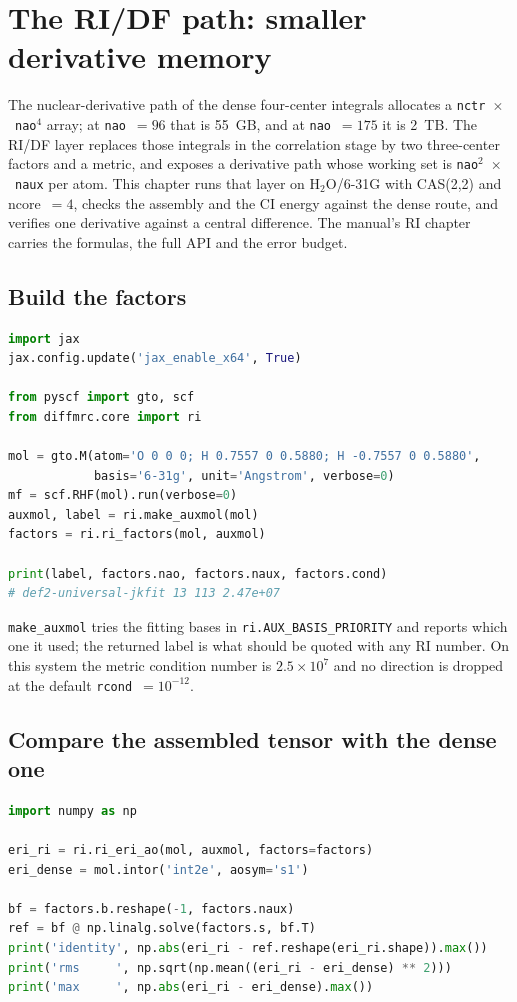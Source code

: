 \section{The RI/DF path: smaller derivative memory}
\label{sec:ri-df}

The nuclear-derivative path of the dense four-center integrals allocates
a \texttt{nctr}~$\times$~\texttt{nao}$^4$ array; at \texttt{nao}~$=96$
that is 55~GB, and at \texttt{nao}~$=175$ it is 2~TB.  The RI/DF layer
replaces those integrals in the correlation stage by two three-center
factors and a metric, and exposes a derivative path whose working set is
\texttt{nao}$^2$~$\times$~\texttt{naux} per atom.  This chapter runs
that layer on H$_2$O/6-31G with CAS(2,2) and ncore~$=4$, checks the
assembly and the CI energy against the dense route, and verifies one
derivative against a central difference.  The manual's RI chapter
carries the formulas, the full API and the error budget.

\subsection{Build the factors}

\begin{lstlisting}[language=Python]
import jax
jax.config.update('jax_enable_x64', True)

from pyscf import gto, scf
from diffmrc.core import ri

mol = gto.M(atom='O 0 0 0; H 0.7557 0 0.5880; H -0.7557 0 0.5880',
            basis='6-31g', unit='Angstrom', verbose=0)
mf = scf.RHF(mol).run(verbose=0)
auxmol, label = ri.make_auxmol(mol)
factors = ri.ri_factors(mol, auxmol)

print(label, factors.nao, factors.naux, factors.cond)
# def2-universal-jkfit 13 113 2.47e+07
\end{lstlisting}

\texttt{make\_auxmol} tries the fitting bases in
\texttt{ri.AUX\_BASIS\_PRIORITY} and reports which one it used; the
returned label is what should be quoted with any RI number.  On this
system the metric condition number is $2.5\times10^{7}$ and no direction
is dropped at the default \texttt{rcond}~$=10^{-12}$.

\subsection{Compare the assembled tensor with the dense one}

\begin{lstlisting}[language=Python]
import numpy as np

eri_ri = ri.ri_eri_ao(mol, auxmol, factors=factors)
eri_dense = mol.intor('int2e', aosym='s1')

bf = factors.b.reshape(-1, factors.naux)
ref = bf @ np.linalg.solve(factors.s, bf.T)
print('identity', np.abs(eri_ri - ref.reshape(eri_ri.shape)).max())
print('rms     ', np.sqrt(np.mean((eri_ri - eri_dense) ** 2)))
print('max     ', np.abs(eri_ri - eri_dense).max())
\end{lstlisting}


